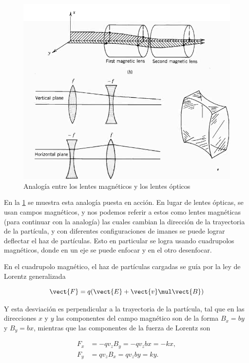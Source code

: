 \documentclass[12pt]{article}
\theoremstyle{break}
\theoremstyle{nonumberbreak}
\begin{document}
    \begin{figure}[htb]
        \centering
        \includegraphics[scale=0.6]{analogy}
        \caption{Analogía entre los lentes magnéticos y los lentes ópticos}
        \label{fig:analogy}
    \end{figure}

    En la \cref{fig:analogy} se muestra esta analogía puesta en acción. En lugar de lentes ópticas, se usan campos magnéticos, y nos podemos referir a estos como lentes magnéticas (para continuar con la analogía) las cuales cambian la dirección de la trayectoria de la partícula, y con diferentes configuraciones de imanes se puede lograr deflectar el haz de partículas. Esto en particular se logra usando cuadrupolos magnéticos, donde en un eje se puede enfocar y en el otro desenfocar.

    En el cuadrupolo magnético, el haz de partículas cargadas se guía por la ley de Lorentz generalizada

    \begin{equation*}
      \vect{F} = q(\vect{E} + \vect{v} \mul \vect{B})
    \end{equation*}

    Y esta desviación es perpendicular a la trayectoria de la partícula, tal que en las direcciones $x$ y $y$ las componentes del campo magnético son de la forma \(B_{x} = by\) y \(B_{y} = bx\), mientras que las componentes de la fuerza de Lorentz son

    \begin{align*}
      F_{x} &= -qv_{z}B_{y} = -qv_{z}bx = -kx,\\
      F_{y} &= qv_{z}B_{x} = qv_{z}by = ky.
    \end{align*}
\end{document}

